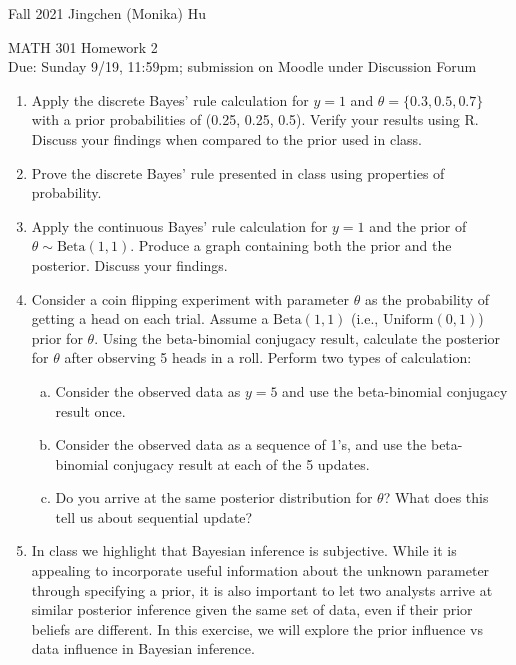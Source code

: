\documentclass[11pt]{article}
\begin{document}
\enlargethispage{\baselineskip}

Fall 2021 \hfill Jingchen (Monika) Hu\\

\begin{center}
{\huge MATH 301 Homework 2}	\\
Due: Sunday 9/19, 11:59pm; submission on Moodle under Discussion Forum
\end{center}
\vspace{0.5cm}

\begin{enumerate}
\item Apply the discrete Bayes' rule calculation for $y = 1$ and $\theta = \{0.3, 0.5, 0.7\}$ with a prior probabilities of (0.25, 0.25, 0.5). Verify your results using R. Discuss your findings when compared to the prior used in class.

\item Prove the discrete Bayes' rule presented in class using properties of probability.

\item Apply the continuous Bayes' rule calculation for $y = 1$ and the prior of $\theta \sim \textrm{Beta}(1, 1)$. Produce a graph containing both the prior and the posterior. Discuss your findings.

\item Consider a coin flipping experiment with parameter $\theta$ as the probability of getting a head on each trial. Assume a $\textrm{Beta}(1, 1)$ (i.e., $\textrm{Uniform}(0, 1)$) prior for $\theta$. Using the beta-binomial conjugacy result, calculate the posterior for $\theta$ after observing 5 heads in a roll. Perform two types of calculation: 

\begin{enumerate}[(a)]
\item Consider the observed data as $y = 5$ and use the beta-binomial conjugacy result once.

\item Consider the observed data as a sequence of 1's, and use the beta-binomial conjugacy result at each of the 5 updates.

\item Do you arrive at the same posterior distribution for $\theta$? What does this tell us about sequential update?

\end{enumerate}

\item In class we highlight that Bayesian inference is subjective. While it is appealing to incorporate useful information about the unknown parameter through specifying a prior, it is also important to let two analysts arrive at similar posterior inference given the same set of data, even if their prior beliefs are different. In this exercise, we will explore the prior influence vs data influence in Bayesian inference.


\end{enumerate}
\end{document}
